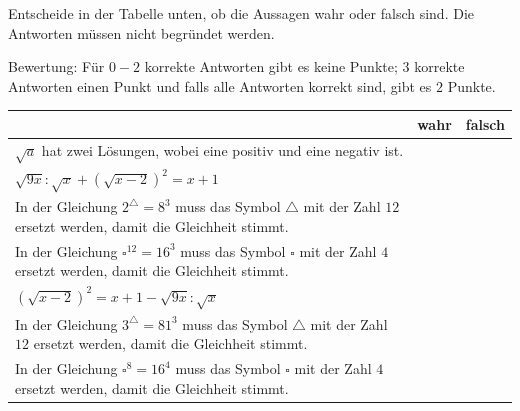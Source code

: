 \documentclass[11pt]{exam}
\begin{document}
\begin{questions}
\question[2]
Entscheide in der Tabelle unten, ob die Aussagen wahr oder falsch sind. Die Antworten müssen nicht begründet werden.\newline
\begin{small}
    Bewertung: Für $0-2$ korrekte Antworten gibt es keine Punkte; $3$ korrekte Antworten einen Punkt und falls alle Antworten korrekt sind, gibt es $2$ Punkte.
\end{small}
\begingroup
\renewcommand{\arraystretch}{1.5}
\begin{table}[H]
    \centering
    \begin{tabular}{|p{12cm}|c|c|}\hline
         & wahr & falsch \\\hline
        $\sqrt{a}$ hat zwei Lösungen, wobei eine positiv und eine negativ ist. & & \\\hline
        $\displaystyle\sqrt{9x}:\sqrt{x}+\left(\sqrt{x-2}\right)^2=x+1$ & & \\\hline %
        In der Gleichung $2^\triangle=8^{3}$ muss das Symbol $\triangle$ mit der Zahl $12$ ersetzt werden, damit die Gleichheit stimmt. & & \\\hline
        In der Gleichung $\square^{12}=16^3$ muss das Symbol $\square$ mit der Zahl $4$ ersetzt werden, damit die Gleichheit stimmt.  & & \\\hline
        $\displaystyle\left(\sqrt{x-2}\right)^2=x+1-\sqrt{9x}:\sqrt{x}$ & & \\\hline %
        In der Gleichung $3^\triangle=81^{3}$ muss das Symbol $\triangle$ mit der Zahl $12$ ersetzt werden, damit die Gleichheit stimmt. & & \\\hline
        In der Gleichung $\square^{8}=16^4$ muss das Symbol $\square$ mit der Zahl $4$ ersetzt werden, damit die Gleichheit stimmt.  & & \\\hline
    \end{tabular}
\end{table}
\endgroup

\end{questions}
\end{document}
